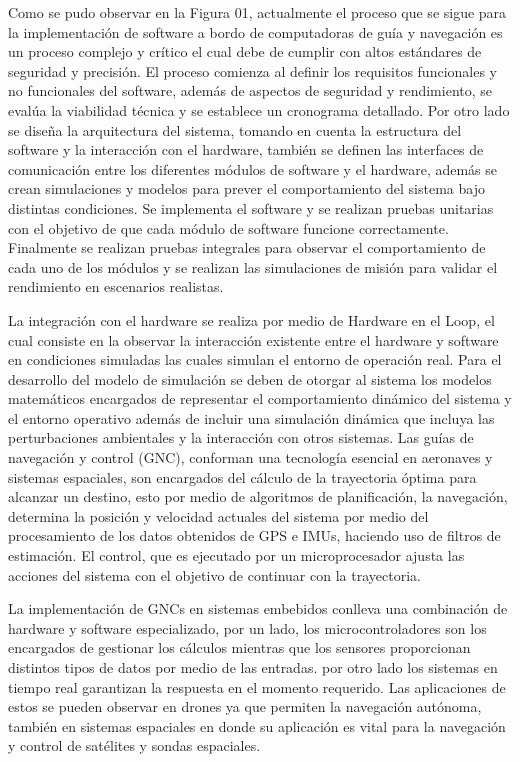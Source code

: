 \documentclass[12pt]{article}
\begin{document}
Como se pudo observar en la Figura 01, actualmente el proceso que se sigue para la implementación de software a bordo de computadoras de guía y navegación es un proceso complejo y crítico el cual debe de cumplir con altos estándares de seguridad y precisión. El proceso comienza al definir los requisitos funcionales y no funcionales del software, además de aspectos de seguridad y rendimiento, se evalúa la viabilidad técnica y se establece un cronograma detallado. Por otro lado se diseña la arquitectura del sistema, tomando en cuenta la estructura del software y la interacción con el hardware, también se definen las interfaces de comunicación entre los diferentes módulos de software y el hardware, además se crean simulaciones y modelos para prever el comportamiento del sistema bajo distintas condiciones. Se implementa el software y se realizan pruebas unitarias con el objetivo de que cada módulo de software funcione correctamente. Finalmente se realizan pruebas integrales para observar el comportamiento de cada uno de los módulos y se realizan las simulaciones de misión para validar el rendimiento en escenarios realistas.

La integración con el hardware se realiza por medio de Hardware en el Loop, el cual consiste en la observar la interacción existente entre el hardware y software en condiciones simuladas las cuales simulan el entorno de operación real. Para el desarrollo del modelo de simulación se deben de otorgar al sistema los modelos matemáticos encargados de representar el comportamiento dinámico del sistema y el entorno operativo además de incluir una simulación dinámica que incluya las perturbaciones ambientales y la interacción con otros sistemas.
Las guías de navegación y control (GNC), conforman una tecnología esencial en aeronaves y sistemas espaciales, son encargados del cálculo de la trayectoria óptima para alcanzar un destino, esto por medio de algoritmos de planificación, la navegación, determina la posición y velocidad actuales del sistema por medio del procesamiento de los datos obtenidos de  GPS e IMUs, haciendo uso de filtros de estimación. El control, que es ejecutado por un microprocesador ajusta las acciones del sistema con el objetivo de continuar con la trayectoria. 

La implementación de GNCs en sistemas embebidos conlleva una combinación de hardware y software especializado, por un lado, los microcontroladores son los encargados de gestionar los cálculos mientras que los sensores proporcionan distintos tipos de datos por medio de las entradas. por otro lado los sistemas en tiempo real garantizan la respuesta en el momento requerido. Las aplicaciones de estos se pueden observar en drones ya que permiten la navegación autónoma, también en sistemas espaciales en donde su aplicación es vital para la navegación y control de satélites y sondas espaciales.
\end{document}
